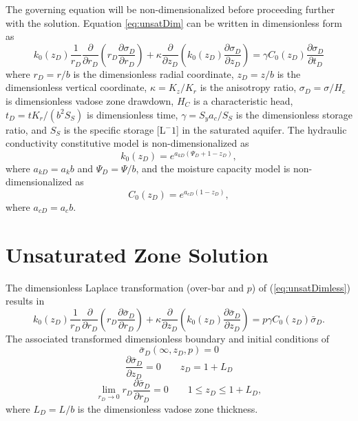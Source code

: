 \documentclass[12pt,letterpaper]{article}
\begin{document}
The governing equation will be non-dimensionalized before proceeding
further with the solution. Equation \eqref{eq:unsatDim} can be written
in dimensionless form as
\begin{equation}
  \label{eq:unsatDimless}
  k_0(z_D) \frac{1}{r_D} \frac{\partial}{\partial r_D} \left( r_D\frac{\partial \sigma_D}{\partial r_D} \right) + \kappa \frac{\partial}{\partial z_D} \left( k_0(z_D) \frac{\partial \sigma_D}{\partial z_D}\right) = \gamma C_0(z_D) \frac{\partial \sigma_D}{\partial t_D}
\end{equation}
where $r_D=r/b$ is the dimensionless radial coordinate, $z_D=z/b$ is
the dimensionless vertical coordinate, $\kappa=K_z/K_r$ is the
anisotropy ratio, $\sigma_D = \sigma/H_c$ is dimensionless vadose zone
drawdown, $H_C$ is a characteristic head, $t_D = t K_r / (b^2 S_S)$ is
dimensionless time, $\gamma = S_y a_c/S_S$ is the dimensionless
storage ratio, and $S_S$ is the specific storage [L$^-1$] in the
saturated aquifer.  The hydraulic conductivity constitutive model is
non-dimensionalized as
\begin{equation}
  \label{eq:GardnerDimless}
 k_0(z_D)=e^{a_{kD} \left( \Psi_D + 1 - z_D \right)},
\end{equation}
where $a_{kD} = a_k b$ and $\Psi_D=\Psi/b$, and the moisture capacity
model is non-dimensionalized as
\begin{equation}
  \label{eq:mrcDimless}
C_0(z_D) = e^{a_{cD} \left( 1-z_D\right)},
\end{equation}
where $a_{cD} = a_c b$.

\section{Unsaturated Zone Solution}
The dimensionless Laplace transformation (over-bar and $p$) of
(\ref{eq:unsatDimless}) results in
\begin{equation}
  \label{eq:unsatLap}
  k_0(z_D) \frac{1}{r_D} \frac{\partial}{\partial r_D} \left( r_D\frac{\partial \bar{\sigma}_D}{\partial r_D} \right) +\kappa \frac{\partial}{\partial z_D} \left( k_0(z_D) \frac{\partial \bar{\sigma}_D}{\partial z_D}\right) = p \gamma C_0(z_D)  \bar{\sigma}_D.
\end{equation}
The associated transformed dimensionless boundary and initial
conditions of
\begin{equation}\nonumber
 \bar{\sigma}_D(\infty,z_D,p) = 0
\end{equation}
\begin{equation}\nonumber
 \frac{\partial \bar{\sigma}_D}{\partial z_D}=0 \qquad z_D=1+L_D
\end{equation}
 \begin{equation}\nonumber
\lim_{r_D \rightarrow 0} r_D \frac{\partial \bar{\sigma}_D}{\partial r_D} = 0 \qquad 1\le z_D \le 1+L_D,
\end{equation}
where $L_D = L/b$ is the dimensionless vadose zone thickness.
\end{document}
